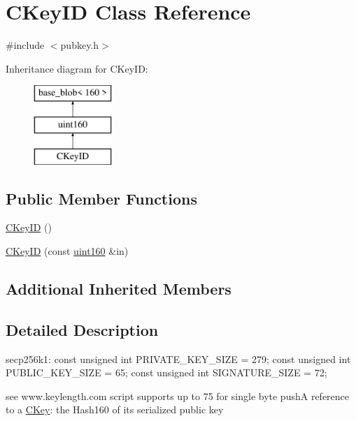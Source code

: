 \hypertarget{class_c_key_i_d}{}\section{C\+Key\+I\+D Class Reference}
\label{class_c_key_i_d}


{\ttfamily \#include $<$pubkey.\+h$>$}

Inheritance diagram for C\+Key\+I\+D\+:\begin{figure}[H]
\begin{center}
\leavevmode
\includegraphics[height=3.000000cm]{class_c_key_i_d}
\end{center}
\end{figure}
\subsection*{Public Member Functions}
\begin{DoxyCompactItemize}
\item 
\hyperlink{class_c_key_i_d_a01dbd3c37820a2ffe89d106c6a7cf53d}{C\+Key\+I\+D} ()
\item 
\hyperlink{class_c_key_i_d_a695f373e11730318f9103100fa006a7e}{C\+Key\+I\+D} (const \hyperlink{classuint160}{uint160} \&in)
\end{DoxyCompactItemize}
\subsection*{Additional Inherited Members}


\subsection{Detailed Description}
secp256k1\+: const unsigned int P\+R\+I\+V\+A\+T\+E\+\_\+\+K\+E\+Y\+\_\+\+S\+I\+Z\+E = 279; const unsigned int P\+U\+B\+L\+I\+C\+\_\+\+K\+E\+Y\+\_\+\+S\+I\+Z\+E = 65; const unsigned int S\+I\+G\+N\+A\+T\+U\+R\+E\+\_\+\+S\+I\+Z\+E = 72;

see www.\+keylength.\+com script supports up to 75 for single byte push\+A reference to a \hyperlink{class_c_key}{C\+Key}\+: the Hash160 of its serialized public key 

